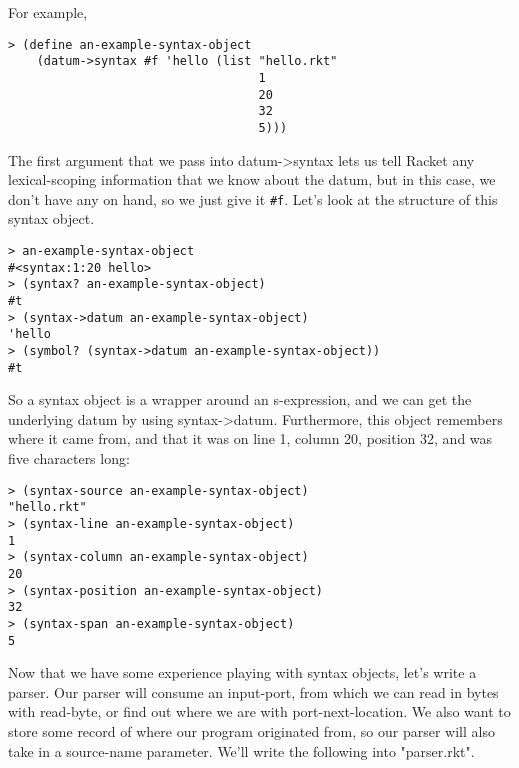 \documentclass{article}
\begin{document}
For example,
\begin{verbatim}
> (define an-example-syntax-object
    (datum->syntax #f 'hello (list "hello.rkt"
                                   1
                                   20
                                   32
                                   5)))
\end{verbatim}
The first argument that we pass into datum->syntax lets us tell Racket any lexical-scoping information that we know about the datum, but in this case, we don't have any on hand, so we just give it \verb+#f+. Let's look at the structure of this syntax object.
\begin{verbatim}
> an-example-syntax-object
#<syntax:1:20 hello>
> (syntax? an-example-syntax-object)
#t
> (syntax->datum an-example-syntax-object)
'hello
> (symbol? (syntax->datum an-example-syntax-object))
#t
\end{verbatim}
So a syntax object is a wrapper around an s-expression, and we can get the underlying datum by using syntax->datum. Furthermore, this object remembers where it came from, and that it was on line 1, column 20, position 32, and was five characters long:
\begin{verbatim}
> (syntax-source an-example-syntax-object)
"hello.rkt"
> (syntax-line an-example-syntax-object)
1
> (syntax-column an-example-syntax-object)
20
> (syntax-position an-example-syntax-object)
32
> (syntax-span an-example-syntax-object)
5
\end{verbatim}
Now that we have some experience playing with syntax objects, let's write a parser. Our parser will consume an input-port, from which we can read in bytes with read-byte, or find out where we are with port-next-location. We also want to store some record of where our program originated from, so our parser will also take in a source-name parameter. We'll write the following into "parser.rkt".
\end{document}
